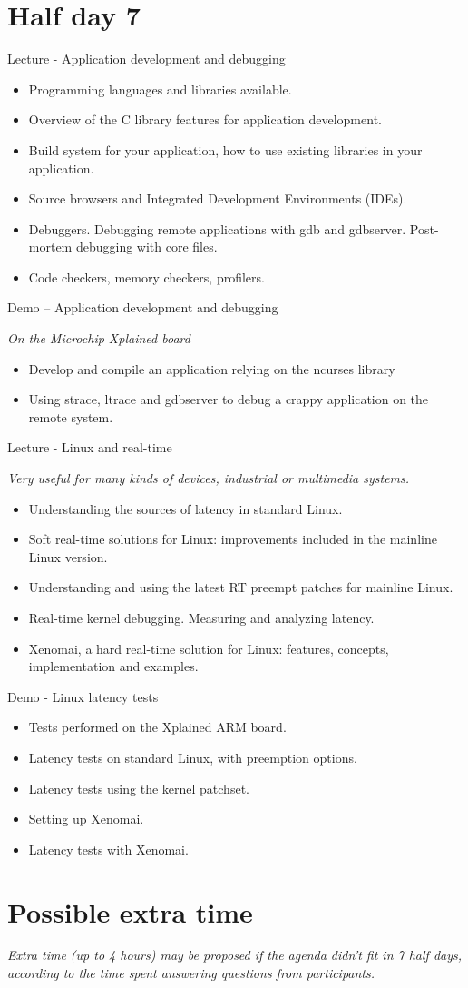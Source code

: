 \documentclass[a4paper,12pt,obeyspaces,spaces,hyphens]{article}
\begin{document}
\section{Half day 7}

\feagendatwocolumn
{Lecture - Application development and debugging}
{
  \begin{itemize}
  \item Programming languages and libraries available.
  \item Overview of the C library features for application development.
  \item Build system for your application,
        how to use existing libraries in your application.
  \item Source browsers and Integrated Development Environments (IDEs).
  \item Debuggers. Debugging remote applications with gdb and gdbserver.
        Post-mortem debugging with core files.
  \item Code checkers, memory checkers, profilers.
  \end{itemize}
}
{Demo – Application development and debugging}
{
  {\em On the Microchip Xplained board}
  \begin{itemize}
  \item Develop and compile an application relying on the ncurses library
  \item Using strace, ltrace and gdbserver to debug a crappy application
        on the remote system.
  \end{itemize}
}

\newpage

\feagendatwocolumn
{Lecture - Linux and real-time}
{
  {\em Very useful for many kinds of devices, industrial or multimedia systems.}
  \begin{itemize}
  \item Understanding the sources of latency in standard Linux.
  \item Soft real-time solutions for Linux: improvements included
        in the mainline Linux version.
  \item Understanding and using the latest RT preempt patches for
        mainline Linux.
  \item Real-time kernel debugging. Measuring and analyzing latency.
  \item Xenomai, a hard real-time solution for Linux: features, concepts,
        implementation and examples.
  \end{itemize}
}
{Demo - Linux latency tests}
{
  \begin{itemize}
  \item Tests performed on the Xplained ARM board.
  \item Latency tests on standard Linux, with preemption options.
  \item Latency tests using the  kernel patchset.
  \item Setting up Xenomai.
  \item Latency tests with Xenomai.
  \end{itemize}
}

\section{Possible extra time}

{\em Extra time (up to 4 hours) may be proposed if the agenda didn't fit in 7 half days,
     according to the time spent answering questions from participants.}
\end{document}
